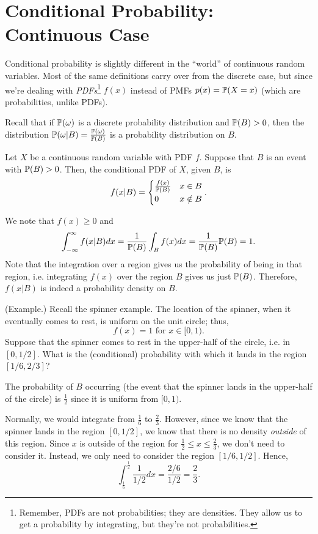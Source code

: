 \documentclass[letterpaper]{article}
\begin{document}
\section{Conditional Probability: Continuous Case}
Conditional probability is slightly different in the ``world'' of continuous random variables. Most of the same definitions carry over from the discrete case, but since we're dealing with \emph{PDFs}\footnote{Remember, PDFs are not probabilities; they are densities. They allow us to get a probability by integrating, but they're not probabilities.} $f(x)$ instead of PMFs $p(x) = \mathbb{P}(X = x)$ (which are probabilities, unlike PDFs).

\bigskip 

Recall that if $\mathbb{P}(\omega)$ is a discrete probability distribution and $\mathbb{P}(B) > 0$, then the distribution $\mathbb{P}(\omega | B) = \frac{\mathbb{P}(\omega)}{\mathbb{P}(B)}$ is a probability distribution on $B$.
\begin{definition}{}{}
    Let $X$ be a continuous random variable with PDF $f$. Suppose that $B$ is an event with $\mathbb{P}(B) > 0$. Then, the conditional PDF of $X$, given $B$, is 
    \[f(x | B) = \begin{cases}
        \frac{f(x)}{\mathbb{P}(B)} & x \in B \\ 
        0 & x \notin B
    \end{cases}.\]
\end{definition}
We note that $f(x) \geq 0$ and 
\[\int_{-\infty}^{\infty} f(x | B) dx = \frac{1}{\mathbb{P}(B)} \int_{B} f(x) dx = \frac{1}{\mathbb{P}(B)} \mathbb{P}(B) = 1.\]
Note that the integration over a region gives us the probability of being in that region, i.e. integrating $f(x)$ over the region $B$ gives us just $\mathbb{P}(B)$. Therefore, $f(x | B)$ is indeed a probability density on $B$. 

\begin{mdframed}[]
    (Example.) Recall the spinner example. The location of the spinner, when it eventually comes to rest, is uniform on the unit circle; thus, 
    \[f(x) = 1 \text{ for } x \in [0, 1).\]
    Suppose that the spinner comes to rest in the upper-half of the circle, i.e. in $[0, 1/2]$. What is the (conditional) probability with which it lands in the region $[1/6, 2/3]$?

    \begin{mdframed}[]
        The probability of $B$ occurring (the event that the spinner lands in the upper-half of the circle) is $\frac{1}{2}$ since it is uniform from $[0, 1)$.

        \bigskip 

        Normally, we would integrate from $\frac{1}{6}$ to $\frac{2}{3}$. However, since we know that the spinner lands in the region $[0, 1/2]$, we know that there is no density \emph{outside} of this region. Since $x$ is outside of the region for $\frac{1}{2} \leq x \leq \frac{2}{3}$, we don't need to consider it. Instead, we only need to consider the region $[1/6, 1/2]$. Hence,
        \[\int_{\frac{1}{6}}^{\frac{1}{2}} \frac{1}{1/2} dx = \frac{2/6}{1/2} = \frac{2}{3}.\]
    \end{mdframed}
\end{mdframed}
\end{document}
